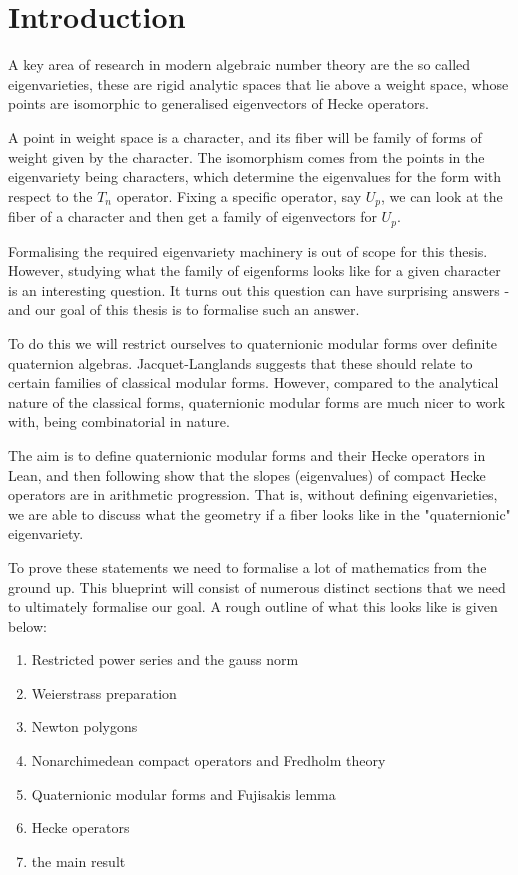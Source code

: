 \chapter{Introduction}


A key area of research in modern algebraic number theory are the so called eigenvarieties, these
are rigid analytic spaces that lie above a weight space, whose points are isomorphic to
generalised eigenvectors of Hecke operators.

A point in weight space is a character, and its fiber will be family of forms of weight given by the
character. The isomorphism comes from the points in the eigenvariety being characters, which
determine the eigenvalues for the form with respect to the $T_n$ operator. Fixing a specific operator,
say $U_p$, we can look at the fiber of a character and then get a family of eigenvectors for $U_p$.

Formalising the required eigenvariety machinery is out of scope for this thesis. However, studying
what the family of eigenforms looks like for a given character is an interesting question. It turns
out this question can have surprising answers - and our goal of this thesis is to formalise
such an answer.

To do this we will restrict ourselves to quaternionic modular forms over definite quaternion algebras.
Jacquet-Langlands suggests that these should relate to certain families of classical modular forms.
However, compared to the analytical nature of the classical forms, quaternionic modular forms are
much nicer to work with, being combinatorial in nature.

The aim is to define quaternionic modular forms and their Hecke operators in Lean, and then following
\cite{Jacobs} show that the slopes (eigenvalues) of compact Hecke operators are in arithmetic
progression. That is, without defining eigenvarieties, we are able to discuss what the geometry
if a fiber looks like in the "quaternionic" eigenvariety.


To prove these statements we need to formalise a lot of mathematics from the ground up. This blueprint
will consist of numerous distinct sections that we need to ultimately formalise our goal. A rough
outline of what this looks like is given below:


\begin{enumerate}
  \item Restricted power series and the gauss norm
  \item Weierstrass preparation
  \item Newton polygons
  \item Nonarchimedean compact operators and Fredholm theory
  \item Quaternionic modular forms and Fujisakis lemma
  \item Hecke operators
  \item the main result
\end{enumerate}
